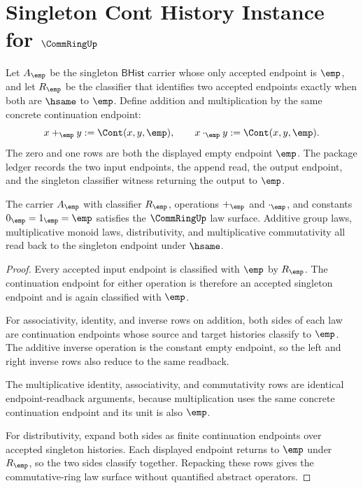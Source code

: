 \section{Singleton Cont History Instance for \texorpdfstring{$\CommRingUp$}{CommRingUp}}
\label{sec:commring-singleton-cont-history-instance}

\begin{definition}
\label{def:commring-singleton-cont-history-instance}
Let $A_{\emp}$ be the singleton $\mathsf{BHist}$ carrier whose only accepted
endpoint is $\emp$, and let $R_{\emp}$ be the classifier that identifies two
accepted endpoints exactly when both are $\hsame$ to $\emp$. Define addition
and multiplication by the same concrete continuation endpoint:
$$
x+_{\emp}y:=\Cont(x,y,\emp),
\qquad
x\cdot_{\emp}y:=\Cont(x,y,\emp).
$$
The zero and one rows are both the displayed empty endpoint $\emp$. The
package ledger records the two input endpoints, the append read, the output
endpoint, and the singleton classifier witness returning the output to
$\emp$.
\end{definition}

\begin{theorem}
\label{thm:commring-singleton-cont-commutative-laws}
The carrier $A_{\emp}$ with classifier $R_{\emp}$, operations
$+_{\emp}$ and $\cdot_{\emp}$, and constants $0_{\emp}=1_{\emp}=\emp$
satisfies the $\CommRingUp$ law surface. Additive group laws, multiplicative
monoid laws, distributivity, and multiplicative commutativity all read back to
the singleton endpoint under $\hsame$.
\end{theorem}
\begin{proof}
Every accepted input endpoint is classified with $\emp$ by $R_{\emp}$. The
continuation endpoint for either operation is therefore an accepted singleton
endpoint and is again classified with $\emp$.

For associativity, identity, and inverse rows on addition, both sides of each
law are continuation endpoints whose source and target histories classify to
$\emp$. The additive inverse operation is the constant empty endpoint, so the
left and right inverse rows also reduce to the same readback.

The multiplicative identity, associativity, and commutativity rows are
identical endpoint-readback arguments, because multiplication uses the same
concrete continuation endpoint and its unit is also $\emp$.

For distributivity, expand both sides as finite continuation endpoints over
accepted singleton histories. Each displayed endpoint returns to $\emp$ under
$R_{\emp}$, so the two sides classify together. Repacking these rows gives the
commutative-ring law surface without quantified abstract operators.
\end{proof}

